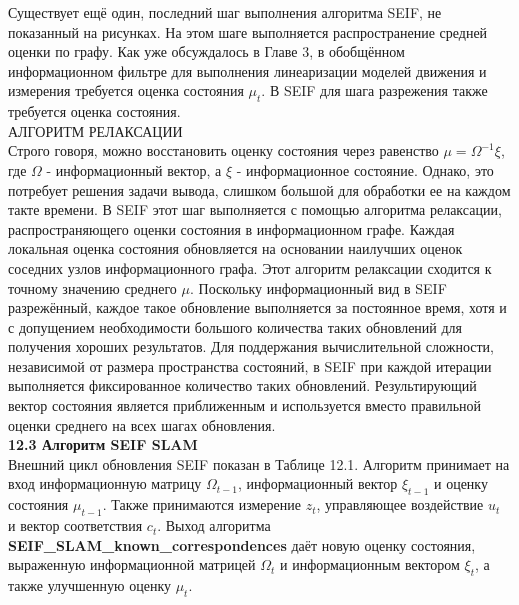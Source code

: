 \documentclass[10pt,a4paper]{article}
\begin{document}
Существует ещё один, последний шаг выполнения алгоритма SEIF, не показанный на рисунках. На этом шаге выполняется распространение средней оценки по графу. Как уже обсуждалось в Главе 3, в обобщённом информационном фильтре для выполнения линеаризации моделей движения и измерения требуется оценка состояния $\mu_t$. В SEIF для шага разрежения также требуется оценка состояния.\\

АЛГОРИТМ РЕЛАКСАЦИИ\\

Строго говоря, можно восстановить оценку состояния через равенство $\mu=\varOmega^{-1}\xi$, где $\varOmega$ - информационный вектор, а $\xi$ - информационное состояние. Однако, это потребует решения задачи вывода, слишком большой для обработки ее на каждом такте времени. В SEIF этот шаг выполняется с помощью алгоритма релаксации, распространяющего оценки состояния в информационном графе. Каждая локальная оценка состояния обновляется на основании наилучших оценок соседних узлов информационного графа. Этот алгоритм релаксации сходится к точному значению среднего $\mu$. Поскольку информационный вид в SEIF разрежённый, каждое такое обновление выполняется за постоянное время, хотя и с допущением необходимости большого количества  таких обновлений для получения хороших результатов. Для поддержания вычислительной сложности, независимой от размера пространства состояний, в SEIF при каждой итерации выполняется фиксированное количество таких обновлений. Результирующий вектор состояния является приближенным и используется вместо правильной оценки среднего на всех шагах обновления.\\  

\textbf{12.3	Алгоритм SEIF SLAM} \\

Внешний цикл обновления SEIF показан в Таблице 12.1. Алгоритм принимает на вход информационную матрицу $\varOmega_{t-1}$, информационный вектор $\xi_{t-1}$ и оценку состояния $\mu_{t-1}$.   Также принимаются измерение $z_t$, управляющее воздействие $u_t$ и вектор соответствия $c_t$. Выход алгоритма \textbf{SEIF\_SLAM\_known\_correspondences} даёт новую оценку состояния, выраженную информационной матрицей $\varOmega_t$ и информационным вектором $\xi_t$, а также улучшенную оценку $\mu_t$.
\end{document}
